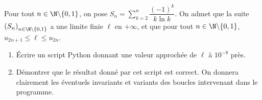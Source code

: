 Pour tout $n\in \N\backslash\{0,1\}$, on pose $S_n=\displaystyle\sum_{k=2}^n 
\dfrac{(-1)^k}{k\ln k}$. On admet que la suite $\left(S_n\right)_{n\in\N\backslash\{0,1\}}$ a 
une limite finie $\ell$ en $+\infty$, et que pour tout $n\in\N\backslash\{0,1\}$, $u_{2n+1}\leq \ell\leq u_{2n}$.

\begin{enumerate}
\item Écrire un script Python donnant une valeur approchée de $\ell$ à $10^{-8}$ près.
\item Démontrer que le résultat donné par cet script est correct. On donnera clairement les éventuels invariants et variants des boucles intervenant dans 
le programme.
\end{enumerate}